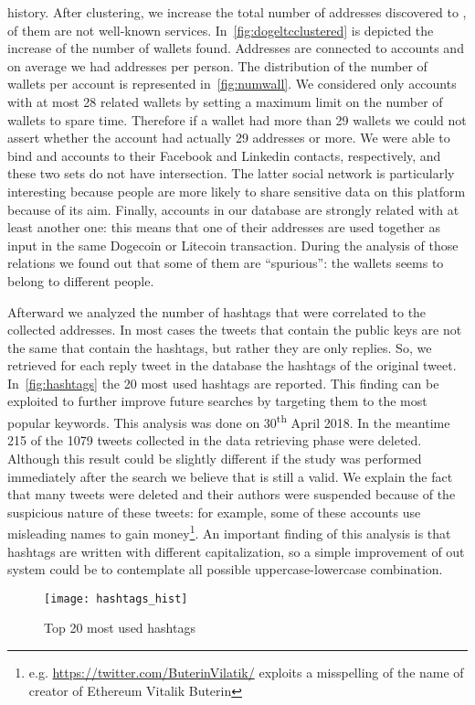 history. After clustering, we increase the total number of addresses discovered
to \clusteringNumberAllWallets{}, \clusteringNumberWalletsNotService{} of them
are not well-known services.
In~\autoref{fig:dogeltcclustered} is depicted the increase of the number of
wallets found.
Addresses are connected to \accountNumber{} accounts and on average we had
\avarageAccount{} addresses per person.
The distribution of the number of wallets per account is represented
in~\autoref{fig:numwall}. We considered only accounts with at most 28 related
wallets by setting a maximum limit on the number of
wallets to spare time.
Therefore if a wallet had more than 29 wallets we could not assert whether
the account had actually 29 addresses or more.
We were able to bind \facebookRelatedAccounts{} and \linkedinRelatedAccount{}
accounts to their Facebook and Linkedin contacts, respectively, and these two
sets do not have intersection. The latter social network is particularly
interesting because people are more likely to share sensitive data on this
platform because of its aim.
Finally, \accountRelated{} accounts in our database are strongly related with
at least another one: this means that one of their addresses are used together
as input in the same Dogecoin or Litecoin transaction. During the analysis of
those relations we found out that some of them are ``spurious'': the wallets
seems to belong to different people.

Afterward we analyzed the number of hashtags that were
correlated to the collected addresses.
In most cases the tweets that
contain the public keys are not the same that contain the hashtags, but rather
they are only replies.
So, we retrieved for each reply tweet in the database the hashtags of the
original tweet.
In~\autoref{fig:hashtags} the 20 most used hashtags are reported.
This finding can be exploited to further improve future searches by targeting
them to the most popular keywords.
This analysis was done on 30\textsuperscript{th} April 2018. In the
meantime 215 of the 1079 tweets collected in the data retrieving phase were
deleted. Although
this result could be slightly different if the study was performed immediately
after the search we believe that is still a valid. 
We explain the fact
that many tweets were deleted and their authors were suspended because of
the suspicious nature of these tweets: for example, some of 
these accounts use misleading names to gain
money\footnote{e.g. \url{https://twitter.com/ButerinVilatik/} exploits a
misspelling of the name of creator of Ethereum Vitalik Buterin}.
An important finding of this analysis is that hashtags are written with
different capitalization, so a simple improvement of out system could be to
contemplate all possible uppercase-lowercase combination.

\begin{figure}
\centering
\texttt{[image: hashtags\_hist]}
\caption{Top 20 most used hashtags}
\label{fig:hashtags}
\end{figure}